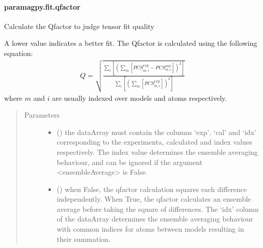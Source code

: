 \documentclass[a4paper,10pt,english,openany,oneside]{sphinxmanual}
\begin{document}
\paragraph{paramagpy.fit.qfactor}
\label{\detokenize{reference/generated/paramagpy.fit.qfactor:paramagpy-fit-qfactor}}\label{\detokenize{reference/generated/paramagpy.fit.qfactor::doc}}

\begin{fulllineitems}
\label{\detokenize{reference/generated/paramagpy.fit.qfactor:paramagpy.fit.qfactor}}
\sphinxAtStartPar
Calculate the Q\sphinxhyphen{}factor to judge tensor fit quality

\sphinxAtStartPar
A lower value indicates a better fit. The Q\sphinxhyphen{}factor is calculated using
the following equation:
\begin{equation*}
\begin{split}Q = \sqrt{
        \frac{\sum_i\left[\left(\sum_m\left[
        PCS^{exp}_{m,i}-PCS^{calc}_{m,i}\right]\right)^2\right]}
        {\sum_i\left[
        \left(\sum_m\left[PCS^{exp}_{m,i}\right]\right)^2\right]}
}\end{split}
\end{equation*}
\sphinxAtStartPar
where \(m\) and \(i\) are usually indexed over models and atoms
respectively.
\begin{quote}\begin{description}
\item[{Parameters}] \leavevmode\begin{itemize}
\item {} 
\sphinxAtStartPar
{} () \textendash{} the dataArray must contain the columns ‘exp’, ‘cal’ and ‘idx’
corresponding to the experimenta, calculated and index values
respectively. The index value determines the ensemble averaging
behaviour, and can be ignored if the argument \textless{}ensembleAverage\textgreater{}
is False.

\item {} 
\sphinxAtStartPar
{} (\sphinxstyleliteralemphasis{\sphinxupquote{, }}) \textendash{} when False, the q\sphinxhyphen{}factor calculation squares each difference
independently.
When True, the q\sphinxhyphen{}factor calculates an ensemble average before
taking the square of differences. The ‘idx’ column of the dataArray
determines the ensemble averaging behaviour with common indices
for atoms between models resulting in their summation.


\end{itemize}
\end{description}
\end{quote}
\end{fulllineitems}
\end{document}
